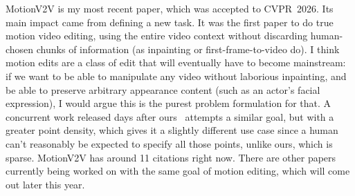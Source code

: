 MotionV2V is my most recent paper, which was accepted to CVPR~2026. Its main impact came from defining a new task. It was the first paper to do true motion video editing, using the entire video context without discarding human-chosen chunks of information (as inpainting or first-frame-to-video do). I think motion edits are a class of edit that will eventually have to become mainstream: if we want to be able to manipulate any video without laborious inpainting, and be able to preserve arbitrary appearance content (such as an actor's facial expression), I would argue this is the purest problem formulation for that.
A concurrent work released days after ours~\cite{lee2026pointtracks} attempts a similar goal, but with a greater point density, which gives it a slightly different use case since a human can't reasonably be expected to specify all those points, unlike ours, which is sparse. MotionV2V has around 11 citations right now. There are other papers currently being worked on with the same goal of motion editing, which will come out later this year.


